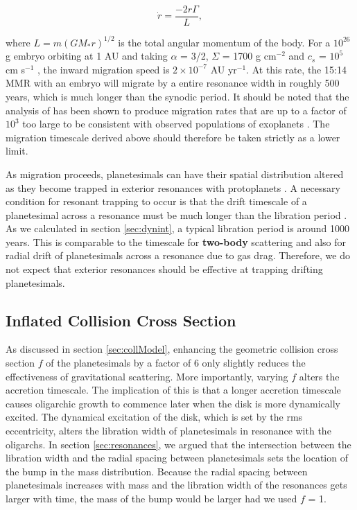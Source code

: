 \begin{equation}\label{eq:t1mig_rate}
    \dot{r} = \frac{-2 r \Gamma}{L},
\end{equation}


\noindent where $L = m \left( G M_{*} r \right)^{1/2}$ is the total angular momentum of the body. For a $10^{26}$ g embryo 
orbiting at 1 AU and taking $\alpha$ = 3/2, $\Sigma$ = 1700 g cm$^{-2}$ and $c_{s}$ = $10^{5}$ cm s$^{-1}$ \cite{hayashi81}, 
the inward migration speed is $2 \times 10^{-7}$ AU yr$^{-1}$. At this rate, the 15:14 MMR with an embryo will migrate by a 
entire resonance width in roughly 500 years, which is much longer than the synodic period. It should be noted that the analysis 
of \cite{tanaka02} has been shown to produce migration rates that are up to a factor of $10^{3}$ too large to be consistent with 
observed populations of exoplanets \cite{ida04, alibert05, miguel11}. The migration timescale derived above should therefore 
be taken strictly as a lower limit.

As migration proceeds, planetesimals can have their spatial distribution altered as they become trapped in exterior resonances 
with protoplanets \cite{weidenschilling85}. A necessary condition for resonant trapping to occur is that the drift timescale of a 
planetesimal across a resonance must be much longer than the libration period \cite{dermott88}. As we calculated in section 
\ref{sec:dynint}, a typical libration period is around 1000 years. This is comparable to the timescale for \textbf{two-body} 
scattering and also for radial drift of planetesimals across a resonance due to gas drag. Therefore, we do not expect that exterior 
resonances should be effective at trapping drifting planetesimals.

\subsection{Inflated Collision Cross Section}

As discussed in section \ref{sec:collModel}, enhancing the geometric collision cross section $f$ of the planetesimals by a factor 
of 6 only slightly reduces the effectiveness of gravitational scattering. More importantly, varying $f$ alters the accretion 
timescale. The implication of this is that a longer accretion timescale causes oligarchic growth to commence later when the disk 
is more dynamically excited. The dynamical excitation of the disk, which is set by the rms eccentricity, alters the libration width of 
planetesimals in resonance with the oligarchs. In section \ref{sec:resonances}, we argued that the intersection between the 
libration width and the radial spacing between planetesimals sets the location of the bump in the mass distribution. Because the 
radial spacing between planetesimals increases with mass and the libration width of the resonances gets larger with time, the 
mass of the bump would be larger had we used $f$ = 1.

